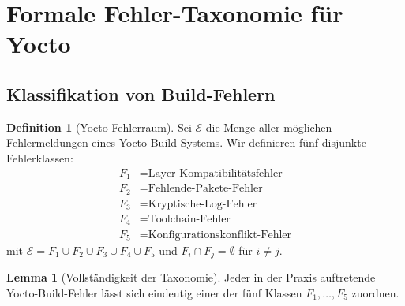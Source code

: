 ﻿\documentclass[a4paper,12pt]{article}
\theoremstyle{definition}
\newtheorem{definition}{Definition}
\newtheorem{lemma}{Lemma}
\begin{document}
\section{Formale Fehler-Taxonomie für Yocto}

\subsection{Klassifikation von Build-Fehlern}

\begin{definition}[Yocto-Fehlerraum]
	Sei $\mathcal{E}$ die Menge aller möglichen Fehlermeldungen eines Yocto-Build-Systems.
	Wir definieren fünf disjunkte Fehlerklassen:
	\begin{align*}
		F_1 &= \text{Layer-Kompatibilitätsfehler} \\
		F_2 &= \text{Fehlende-Pakete-Fehler} \\
		F_3 &= \text{Kryptische-Log-Fehler} \\
		F_4 &= \text{Toolchain-Fehler} \\
		F_5 &= \text{Konfigurationskonflikt-Fehler}
	\end{align*}
	mit $\mathcal{E} = F_1 \cup F_2 \cup F_3 \cup F_4 \cup F_5$ und $F_i \cap F_j = \emptyset$ für $i \neq j$.
\end{definition}

\begin{lemma}[Vollständigkeit der Taxonomie]
\label{lem:vollstaendig}
	Jeder in der Praxis auftretende Yocto-Build-Fehler lässt sich eindeutig
	einer der fünf Klassen $F_1, \ldots, F_5$ zuordnen.
\end{lemma}
\end{document}
